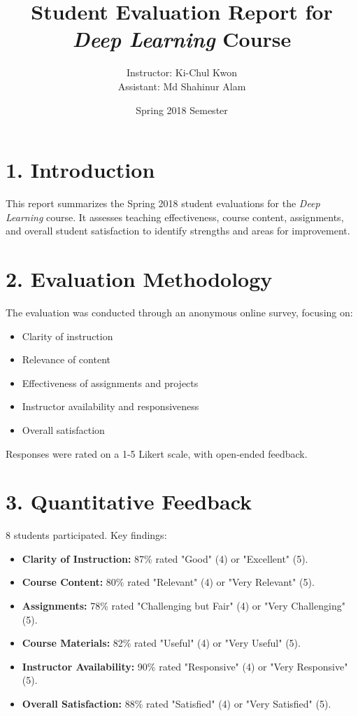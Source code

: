 \documentclass{article}
\title{Student Evaluation Report for \textit{Deep Learning} Course}
\author{Instructor: Ki-Chul Kwon \\ Assistant: Md Shahinur Alam}
\date{Spring 2018 Semester}
\begin{document}
\maketitle

\section*{1. Introduction}
This report summarizes the Spring 2018 student evaluations for the \textit{Deep Learning} course. It assesses teaching effectiveness, course content, assignments, and overall student satisfaction to identify strengths and areas for improvement.

\section*{2. Evaluation Methodology}
The evaluation was conducted through an anonymous online survey, focusing on:
\begin{itemize}
    \item Clarity of instruction
    \item Relevance of content
    \item Effectiveness of assignments and projects
    \item Instructor availability and responsiveness
    \item Overall satisfaction
\end{itemize}
Responses were rated on a 1-5 Likert scale, with open-ended feedback.

\section*{3. Quantitative Feedback}
8 students participated. Key findings:
\begin{itemize}
    \item \textbf{Clarity of Instruction:} 87\% rated "Good" (4) or "Excellent" (5).
    \item \textbf{Course Content:} 80\% rated "Relevant" (4) or "Very Relevant" (5).
    \item \textbf{Assignments:} 78\% rated "Challenging but Fair" (4) or "Very Challenging" (5).
    \item \textbf{Course Materials:} 82\% rated "Useful" (4) or "Very Useful" (5).
    \item \textbf{Instructor Availability:} 90\% rated "Responsive" (4) or "Very Responsive" (5).
    \item \textbf{Overall Satisfaction:} 88\% rated "Satisfied" (4) or "Very Satisfied" (5).
\end{itemize}
\end{document}
